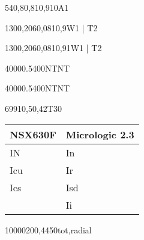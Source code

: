 \documentclass[a4paper,oneside,10pt,danish]{report}
\begin{document}
\begin{faseKOMP-Iny}{540,8}{0,81}{0,9}{10}{A1}
\end{faseKOMP-Iny}

\begin{HV-deltaUnet}{130}{0,206}{0,081}{0,9}{W1 | T2}
\end{HV-deltaUnet}

\begin{LV-deltaU}{130}{0,206}{0,081}{0,9}{1}{W1 | T2}
\end{LV-deltaU}



\begin{FraIkTilZcos}{4000}{0.5}{400}{NT}{NT}
\end{FraIkTilZcos}

\begin{FraIkTilZ}{4000}{0.5}{400}{NT}{NT}
\end{FraIkTilZ}

\begin{I-henført}{699}{10,5}{0,42}{T3}{0}
\end{I-henført}

\begin{table}
	\begin{tabular}{l|l}
		NSX630F & Micrologic 2.3 \\ \hline
		IN      & In             \\
		Icu     & Ir             \\
		Ics     & Isd            \\
		& Ii            
	\end{tabular}
\end{table}

\begin{HV-lækstrøm-pr-fase}{10000}{20}{0,44}{50}{tot,radial}
\end{HV-lækstrøm-pr-fase}
\end{document}
